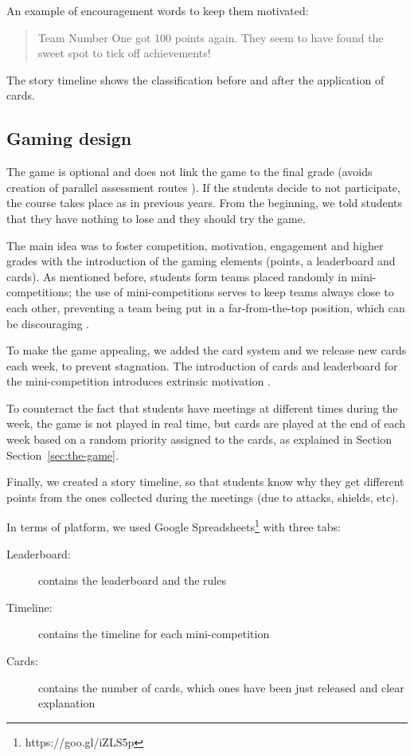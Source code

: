 \documentclass[sigconf]{acmart}
\begin{document}
An example of encouragement words to keep them motivated:

\begin{quote}
Team Number One got 100 points again.
They seem to have found the sweet spot to tick off achievements!
\end{quote}

The story timeline shows the classification before and after the
application of cards.

\hypertarget{gaming-design}{%
\subsection{Gaming design}\label{gaming-design}}

The game is optional and does not link the game to the final grade
(avoids creation of parallel assessment routes \citep{glover2013play}).
If the students decide to not participate, the course takes place as in
previous years. From the beginning, we told students that they have
nothing to lose and they should try the game.

The main idea was to foster competition, motivation, engagement and
higher grades with the introduction of the gaming elements (points, a
leaderboard and cards). As mentioned before, students form teams placed
randomly in mini-competitions; the use of mini-competitions serves to
keep teams always close to each other, preventing a team being put in a
far-from-the-top position, which can be discouraging
\citep{gamification-brain-trust}.

To make the game appealing, we added the card system and we release new
cards each week, to prevent stagnation. The introduction of cards and
leaderboard for the mini-competition introduces extrinsic motivation
\citep{zichermann2011gamification}.

To counteract the fact that students have meetings at different times
during the week, the game is not played in real time, but cards are
played at the end of each week based on a random priority assigned to
the cards, as explained in Section Section~\ref{sec:the-game}.

Finally, we created a story timeline, so that students know why they get
different points from the ones collected during the meetings (due to
attacks, shields, etc).

In terms of platform, we used Google
Spreadsheets\footnote{https://goo.gl/iZLS5p} with three tabs:

\begin{description}
\item[Leaderboard:] contains the leaderboard and the rules
\item[Timeline:] contains the timeline for each mini-competition
\item[Cards:] contains the number of cards, which ones have been just released and clear explanation
\end{description}
\end{document}
